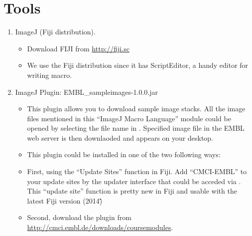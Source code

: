 \section{Tools}
\label{sec:tools}

\begin{enumerate}
  \item ImageJ (Fiji distribution).

\begin{itemize}
    \item Download FIJI from \url{http://fiji.sc}
    \item We use the Fiji distribution since it has ScriptEditor, a handy editor for writing macro. 
  
\end{itemize}
  \item ImageJ Plugin: EMBL\_sampleimages-1.0.0.jar

\begin{itemize}
     \item This plugin allows you to download sample image stacks. All the image files mentioned in this ``ImageJ Macro Language'' module could be opened by selecting the file name in . Specified image file in the EMBL web server is then downlaoded and appears on your desktop.
    \item This plugin could be installed in one of the two following ways:
    \item First, using the ``Update Sites'' function in Fiji. Add ``CMCI-EMBL'' to your update sites by the updater interface that could be acceded via . This ``update site'' function is pretty new in Fiji and usable with the latest Fiji version (2014\~)        
    \item Second, download the plugin from \url{http://cmci.embl.de/downloads/coursemodules}. 
  
\end{itemize}

\end{enumerate}
 
\newpage